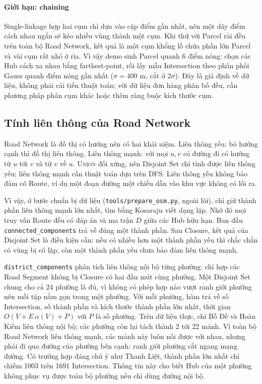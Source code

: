 \paragraph*{Giới hạn: chaining} Single-linkage hợp hai cụm chỉ dựa vào cặp điểm gần nhất, nên một dãy điểm cách nhau ngắn sẽ kéo nhiều vùng thành một cụm. Khi thử với Parcel rải đều trên toàn bộ Road Network, kết quả là một cụm khổng lồ chứa phần lớn Parcel và vài cụm rất nhỏ ở rìa. Vì vậy demo sinh Parcel quanh 6 điểm nóng: chọn các Hub cách xa nhau bằng farthest-point, rồi lấy mẫu Intersection theo phân phối Gauss quanh điểm nóng gần nhất ($\sigma = 400$ m, cắt ở $2\sigma$). Đây là giả định về dữ liệu, không phải cải tiến thuật toán; với dữ liệu đơn hàng phân bố đều, cần phương pháp phân cụm khác hoặc thêm ràng buộc kích thước cụm.

\subsection{Tính liên thông của Road Network}

Road Network là đồ thị có hướng nên có hai khái niệm. Liên thông yếu: bỏ hướng cạnh thì đồ thị liên thông. Liên thông mạnh: với mọi $u, v$ có đường đi có hướng từ $u$ tới $v$ và từ $v$ về $u$. \textsc{Union} đối xứng, nên Disjoint Set chỉ tính được liên thông yếu; liên thông mạnh cần thuật toán dựa trên DFS. Liên thông yếu không bảo đảm có Route, ví dụ một đoạn đường một chiều dẫn vào khu vực không có lối ra.

Vì vậy, ở bước chuẩn bị dữ liệu (\texttt{tools/prepare\_osm.py}, ngoài lõi), chỉ giữ thành phần liên thông mạnh lớn nhất, tìm bằng Kosaraju viết dạng lặp. Nhờ đó mọi truy vấn Route đều có đáp án và ma trận $D$ giữa các Hub hữu hạn. Ban đầu \texttt{connected\_components} trả về đúng một thành phần. Sau Closure, kết quả của Disjoint Set là điều kiện cần: nếu có nhiều hơn một thành phần yếu thì chắc chắn có vùng bị cô lập, còn một thành phần yếu chưa bảo đảm liên thông mạnh.

\texttt{district\_components} phân tích liên thông nội bộ từng phường: chỉ hợp các Road Segment không bị Closure có hai đầu mút cùng phường. Một Disjoint Set chung cho cả 24 phường là đủ, vì không có phép hợp nào vượt ranh giới phường nên mỗi tập nằm gọn trong một phường. Với mỗi phường, hàm trả về số Intersection, số thành phần và kích thước thành phần lớn nhất, thời gian $O(V + E\,\alpha(V) + P)$ với $P$ là số phường. Trên dữ liệu thực, chỉ Bồ Đề và Hoàn Kiếm liên thông nội bộ; các phường còn lại tách thành 2 tới 22 mảnh. Vì toàn bộ Road Network liên thông mạnh, các mảnh này luôn nối được với nhau, nhưng phải đi qua đường của phường bên cạnh: ranh giới phường cắt ngang mạng đường. Có trường hợp đáng chú ý như Thanh Liệt, thành phần lớn nhất chỉ chiếm 1003 trên 1691 Intersection. Thông tin này cho biết Hub của một phường không phục vụ được toàn bộ phường nếu chỉ dùng đường nội bộ.
